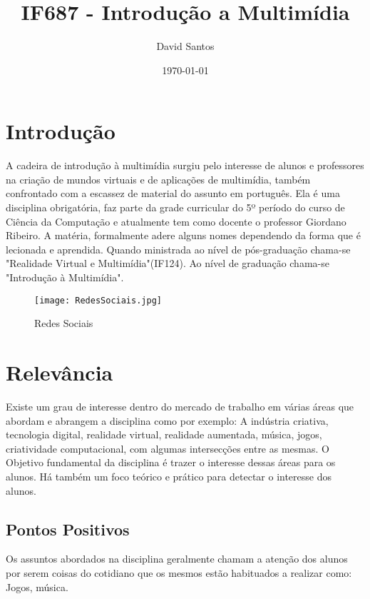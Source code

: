 \documentclass[10pt]{article}
\title{IF687 - Introdução a Multimídia}
\author{David Santos}
\date{\today}
\begin{document}
\maketitle

\section{Introdução}
A cadeira de introdução à multimídia surgiu pelo interesse de alunos e professores na criação de mundos virtuais e de aplicações de multimídia, também confrontado com a escassez de material do assunto em português. Ela é uma disciplina obrigatória, faz parte da grade curricular do 5º período do curso de Ciência da Computação e atualmente tem como docente o professor Giordano Ribeiro.            
A matéria, formalmente adere alguns nomes dependendo da forma que é lecionada e aprendida. Quando ministrada ao nível de pós-graduação chama-se "Realidade Virtual e Multimídia"(IF124). Ao nível de graduação chama-se "Introdução à Multimídia".

\begin{figure}[h!]
\centering
\texttt{[image: RedesSociais.jpg]}
\caption{Redes Sociais}
\label{fig:RedesSociais}
\end{figure}


\section{Relevância}
Existe um grau de interesse dentro do mercado de trabalho em várias áreas que abordam e abrangem a disciplina como por exemplo: A indústria criativa, tecnologia digital, realidade virtual, realidade aumentada, música, jogos, criatividade computacional, com algumas intersecções entre as mesmas. O Objetivo fundamental da disciplina é trazer o interesse dessas áreas para os alunos. Há também um foco teórico e prático para detectar o interesse dos alunos.

\subsection{Pontos Positivos}
Os assuntos abordados na disciplina geralmente chamam a atenção dos alunos por serem coisas do cotidiano que os mesmos estão habituados a realizar como: Jogos, música.  
\end{document}
